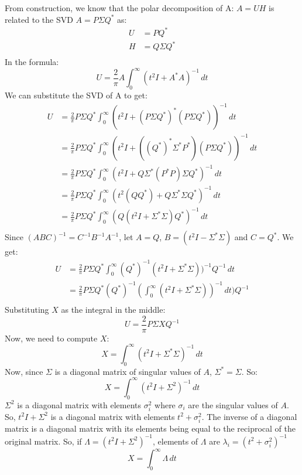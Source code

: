 \documentclass{article}
\begin{document}
From construction, we know that the polar decomposition of A: $A = U H$ is related to the SVD $A = P\Sigma Q^*$ as:
\begin{align*}
    U &= PQ^*\\
    H &= Q \Sigma Q^*\\
\end{align*}
In the formula: 
\[ U = \frac{2}{\pi} A \int_{0}^{\infty} (t^2 I + A^* A)^{-1} \,dt\]
We can substitute the SVD of A to get:
\begin{align*}
    U &= \frac{2}{\pi} P \Sigma Q^* \int_{0}^{\infty} (t^2 I + (P \Sigma Q^*)^* (P \Sigma Q^*))^{-1} \,dt\\
    &= \frac{2}{\pi} P \Sigma Q^* \int_{0}^{\infty} (t^2 I + ((Q^*)^* \Sigma^* P^*) (P \Sigma Q^*))^{-1} \,dt\\
    &= \frac{2}{\pi} P \Sigma Q^* \int_{0}^{\infty} (t^2 I + Q \Sigma^* (P^* P) \Sigma Q^*)^{-1} \,dt\\
    &= \frac{2}{\pi} P \Sigma Q^* \int_{0}^{\infty} (t^2 (Q Q^*) + Q \Sigma^* \Sigma Q^*)^{-1} \,dt\\
    &= \frac{2}{\pi} P \Sigma Q^* \int_{0}^{\infty} (Q(t^2 I + \Sigma^* \Sigma)Q^*)^{-1} \,dt\\
\end{align*}
Since $(ABC)^{-1} = C^{-1} B^{-1} A^{-1}$, let $A = Q$, $B = (t^2 I - \Sigma^* \Sigma)$ and $C = Q^*$. We get:
\begin{align*}
    U &= \frac{2}{\pi} P \Sigma Q^* \int_{0}^{\infty} (Q^*)^{-1} (t^2 I + \Sigma^* \Sigma))^{-1} Q^{-1} \,dt\\
    &= \frac{2}{\pi} P \Sigma Q^* (Q^*)^{-1} (\int_{0}^{\infty} (t^2 I + \Sigma^* \Sigma))^{-1}  \,dt) Q^{-1}\\
\end{align*}
Substituting $X$ as the integral in the middle:
\[ U = \frac{2}{\pi} P \Sigma X Q^{-1}\]
Now, we need to compute $X$:
\[ X = \int_{0}^{\infty} (t^2 I + \Sigma^* \Sigma)^{-1}  \,dt\]
Now, since $\Sigma$ is a diagonal matrix of singular values of $A$, $\Sigma^* = \Sigma$. So:
\[ X = \int_{0}^{\infty} (t^2 I + \Sigma^2)^{-1}  \,dt\]
$\Sigma^2$ is a diagonal matrix with elements $\sigma_{i}^2$ where $\sigma_{i}$ are the singular values of $A$.
So, $t^2 I + \Sigma^2$ is a diagonal matrix with elements $t^2 + \sigma_{i}^2$. The inverse of a diagonal matrix is a diagonal matrix with its elements being equal to the reciprocal of the original matrix. So, if $\Lambda = (t^2 I + \Sigma^2)^{-1}$, elements of $\Lambda$ are $\lambda_{i} = (t^2 + \sigma_{i}^2)^{-1}$
\[ X = \int_{0}^{\infty} \Lambda \,dt\]
\end{document}
